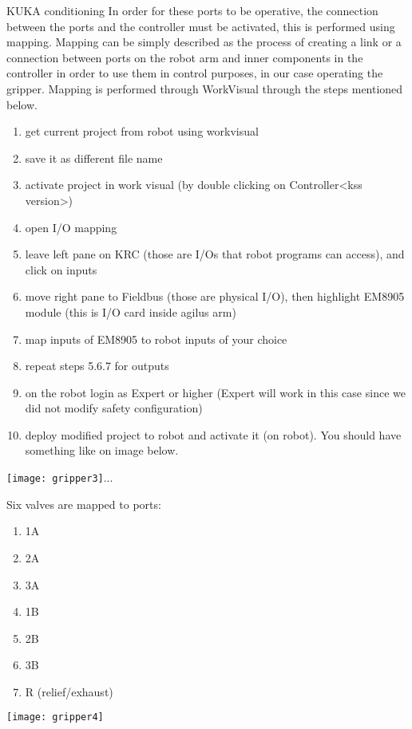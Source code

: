 \documentclass{book}
\begin{document}
\begin{chapter}{KUKA conditioning}
 		\bigskip
 		In order for these ports to be operative, the connection between the ports and the controller must be activated, this is performed using mapping. Mapping can be simply described as the process of creating a link or a connection between ports on the robot arm and inner components in the controller in order to use them in control purposes, in our case operating the gripper. Mapping is performed through WorkVisual through the steps mentioned below.
 			\begin{enumerate}
 				\item get current project from robot using workvisual
 				\item save it as different file name
 				\item activate project in work visual (by double clicking on Controller<kss version>)
 				\item open I/O mapping
 				\item leave left pane on KRC (those are I/Os that robot programs can access), and click on inputs
 				\item move right pane to Fieldbus (those are physical I/O), then highlight EM8905 module (this is I/O card inside agilus arm)
 				\item map inputs of EM8905 to robot inputs of your choice
 				\item repeat steps 5.6.7 for outputs
 				\item on the robot login as Expert or higher (Expert will work in this case since we did not modify safety configuration)
 				\item deploy modified project to robot and activate it (on robot).
 				You should have something like on image below. 
 			\end{enumerate}
 		\begin{center}
 			\texttt{[image: gripper3]}...
 		\end{center}
 	Six valves are mapped to ports:
 	\newline
 		\begin{minipage}{0.5\textwidth}
 			\begin{enumerate}
 				\item 1A
 				\item 2A
 				\item 3A
 				\item 1B
 				\item 2B
 				\item 3B
 				\item R (relief/exhaust) 
 			\end{enumerate}	
 	\end{minipage} \hfill
 	\begin{minipage}{0.5\textwidth}
 			\texttt{[image: gripper4]}
 	\end{minipage}
 

\end{chapter}
\end{document}
